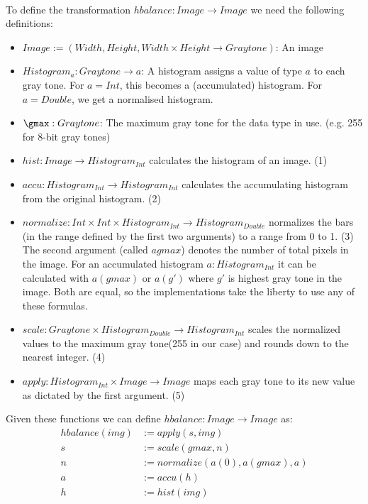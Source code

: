       \paragraph{}
      To define the transformation $ hbalance: Image \rightarrow Image$ we need the following definitions:
      \begin{itemize}
        \item $Image := (Width,Height,Width \times Height \rightarrow Graytone)$:
          An image
        \item $Histogram_a: Graytone \rightarrow a$:
          A histogram  assigns a value of type $a$ to each gray tone. For $a = Int$,
          this becomes a (accumulated) histogram. For $a = Double$, we get
          a normalised histogram.
        \item $\gmax: Graytone$:
          The maximum gray tone for the data type in use. (e.g. 255 for 8-bit gray tones)
        \item $hist: Image \rightarrow Histogram_{Int}$
          calculates the histogram of an image. (1)
        \item $accu: Histogram_{Int} \rightarrow Histogram_{Int}$
          calculates the accumulating histogram from the original histogram. (2)
        \item $normalize: Int \times Int \times Histogram_{Int} \rightarrow Histogram_{Double}$
          normalizes the bars (in the range defined by the first two arguments) to a range from 0 to 1. (3)
          The second argument (called $agmax$) denotes the number of total pixels in the image.
          For an accumulated histogram $a:Histogram_{Int}$ it can be calculated with
          $a(gmax)$ or $a(g')$ where $g'$ is highest gray tone in the image.
          Both are equal, so the implementations take the liberty to use any of these formulas.
        \item $scale: Graytone \times Histogram_{Double} \rightarrow Histogram_{Int}$
          scales the normalized values to the maximum gray tone(255 in our case) and rounds down to the nearest integer. (4)
        \item $apply: Histogram_{Int} \times Image \rightarrow Image$
          maps each gray tone to its new value as dictated by the first argument. (5)
      \end{itemize}
      
      Given these functions we can define $hbalance: Image \rightarrow Image$ as:
      \begin{equation}
      \begin{split}
        hbalance(img) & := apply(s,img) \\
          s & := scale(gmax,n) \\
          n & := normalize(a(0), a(gmax), a) \\
          a & := accu(h) \\
          h & := hist(img) \\
      \end{split}
      \end{equation}
      
